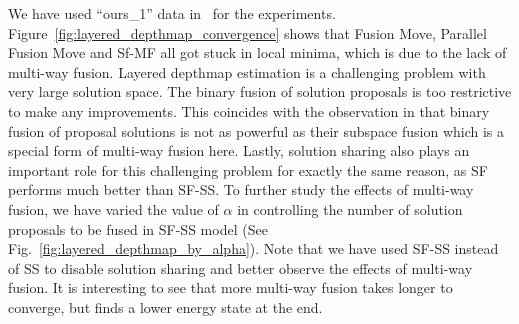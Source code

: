 
\noindent We have used ``ours\_1'' data in~\cite{layered_depthmap} for
the experiments. Figure~\ref{fig:layered_depthmap_convergence} shows
that Fusion Move, Parallel Fusion Move and Sf-MF all got stuck in local
minima, which is due to the lack of multi-way fusion.  Layered depthmap
estimation is a challenging problem with very large solution space. The
binary fusion of solution proposals is too restrictive to make any
improvements.  This coincides with the observation in
\cite{layered_depthmap} that binary fusion of proposal solutions is not
as powerful as their subspace fusion which is a special form of
multi-way fusion here. Lastly, solution sharing also plays an important
role for this challenging problem for exactly the same reason, as SF
performs much better than SF-SS.
%
To further study the effects of multi-way fusion, we have varied the
value of $\alpha$ in controlling the number of solution proposals to be
fused in SF-SS model (See
Fig.~\ref{fig:layered_depthmap_by_alpha}). Note that we have used SF-SS
instead of SS to disable solution sharing and better observe the effects
of multi-way fusion.
It is interesting to see that more multi-way fusion takes longer to
converge, but finds a lower energy state at the end.


